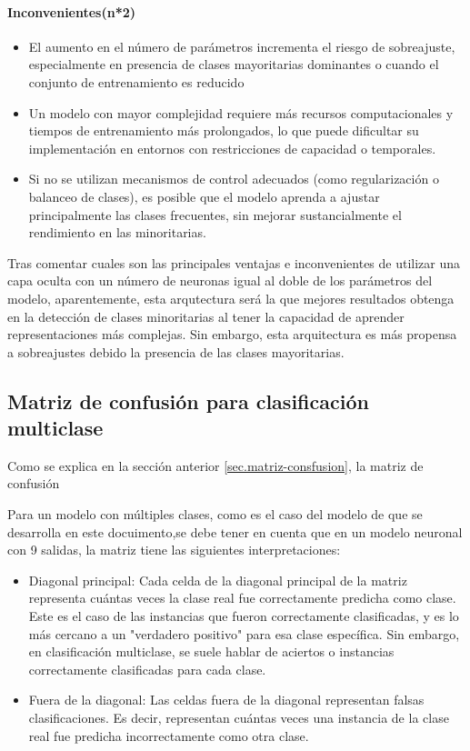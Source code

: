 \paragraph{Inconvenientes(n*2)}
\begin{itemize}
	\item El aumento en el número de parámetros incrementa el riesgo de sobreajuste, especialmente en presencia de clases mayoritarias dominantes o cuando el conjunto de entrenamiento es reducido
	\item Un modelo con mayor complejidad requiere más recursos computacionales y tiempos de entrenamiento más prolongados, lo que puede dificultar su implementación en entornos con restricciones de capacidad o temporales.
	\item Si no se utilizan mecanismos de control adecuados (como regularización o balanceo de clases), es posible que el modelo aprenda a ajustar principalmente las clases frecuentes, sin mejorar sustancialmente el rendimiento en las minoritarias.

\end{itemize}

Tras comentar cuales son las principales ventajas e inconvenientes de utilizar una capa oculta con un número de neuronas igual al doble de los parámetros del modelo, aparentemente, esta arqutectura será la que mejores resultados obtenga en la detección de clases minoritarias al tener la capacidad de aprender representaciones más complejas. Sin embargo, esta arquitectura es más propensa a sobreajustes debido la presencia de las clases mayoritarias.


\subsection{Matriz de confusión para clasificación multiclase} \label{sec.matriz-consfusion-multi}

Como se explica en la sección anterior \ref{sec.matriz-consfusion}, la matriz de confusión 


Para un modelo con múltiples clases, como es el caso del modelo de que se desarrolla en este docuimento,se debe tener en cuenta que en un modelo neuronal con 9 salidas, la matriz tiene las siguientes interpretaciones:
\begin{itemize}
	\item Diagonal principal: Cada celda de la diagonal principal de la matriz representa cuántas veces la clase real fue correctamente predicha como clase. Este es el caso de las instancias que fueron correctamente clasificadas, y es lo más cercano a un "verdadero positivo" para esa clase específica. Sin embargo, en clasificación multiclase, se suele hablar de aciertos o instancias correctamente clasificadas para cada clase.

	\item Fuera de la diagonal: Las celdas fuera de la diagonal representan falsas clasificaciones. Es decir, representan cuántas veces una instancia de la clase real fue predicha incorrectamente como otra clase.

\end{itemize}


